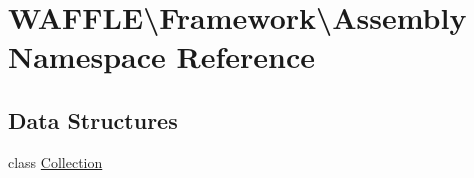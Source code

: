\hypertarget{namespace_w_a_f_f_l_e_1_1_framework_1_1_assembly}{}\section{W\+A\+F\+F\+LE\textbackslash{}Framework\textbackslash{}Assembly Namespace Reference}
\label{namespace_w_a_f_f_l_e_1_1_framework_1_1_assembly}
\subsection*{Data Structures}
\begin{DoxyCompactItemize}
\item 
class \hyperlink{class_w_a_f_f_l_e_1_1_framework_1_1_assembly_1_1_collection}{Collection}
\end{DoxyCompactItemize}
